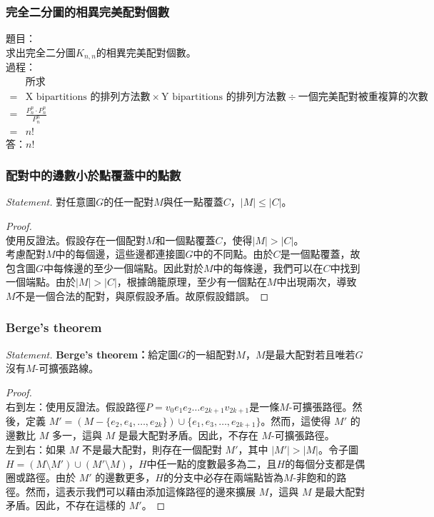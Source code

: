 \documentclass[a4paper,12pt]{report}
\begin{document}
\subsubsection{完全二分圖的相異完美配對個數}
題目：\\
求出完全二分圖$K_{n,n}$的相異完美配對個數。\\
過程：\\
\[
\begin{aligned}
&\text{所求} \\
=&\text{X bipartitions 的排列方法數}\times \text{Y bipartitions 的排列方法數}\div\text{一個完美配對被重複算的次數} \\
=&\frac{P^n_n\cdot P^n_n}{P^n_n} \\
=&n!
\end{aligned}
\]
答：\(n!\)
\subsubsection{配對中的邊數小於點覆蓋中的點數}
\textit{Statement. }對任意圖$G$的任一配對$M$與任一點覆蓋$C$，$|M|\leq |C|$。
\begin{proof}\mbox{}\\
使用反證法。假設存在一個配對$M$和一個點覆蓋$C$，使得$|M| > |C|$。 \\
考慮配對$M$中的每個邊，這些邊都連接圖$G$中的不同點。由於$C$是一個點覆蓋，故包含圖$G$中每條邊的至少一個端點。因此對於$M$中的每條邊，我們可以在$C$中找到一個端點。由於$|M| > |C|$，根據鴿籠原理，至少有一個點在$M$中出現兩次，導致$M$不是一個合法的配對，與原假設矛盾。故原假設錯誤。
\end{proof}
\subsubsection{Berge's theorem}
\textit{Statement. }\textbf{Berge's theorem：}給定圖$G$的一組配對$M$，$M$是最大配對若且唯若$G$沒有$M$-可擴張路線。
\begin{proof}\mbox{}\\
右到左：使用反證法。假設路徑$P = v_0e_1e_2 \ldots e_{2k+1}v_{2k+1}$是一條$M$-可擴張路徑。然後，定義 $M' = (M - \{e_2, e_4, \ldots, e_{2k}\}) \cup \{e_1, e_3, \ldots, e_{2k+1}\}$。然而，這使得 $M'$ 的邊數比 $M$ 多一，這與 $M$ 是最大配對矛盾。因此，不存在 $M$-可擴張路徑。 \\
左到右：如果 $M$ 不是最大配對，則存在一個配對 $M'$，其中 $|M'| > |M|$。令子圖 $H = (M \setminus M')\cup(M'\setminus M)$，$H$中任一點的度數最多為二，且$H$的每個分支都是偶圈或路徑。由於 $M'$ 的邊數更多，$H$的分支中必存在兩端點皆為$M$-非飽和的路徑。然而，這表示我們可以藉由添加這條路徑的邊來擴展 $M$，這與 $M$ 是最大配對矛盾。因此，不存在這樣的 $M'$。
\end{proof}
\end{document}

